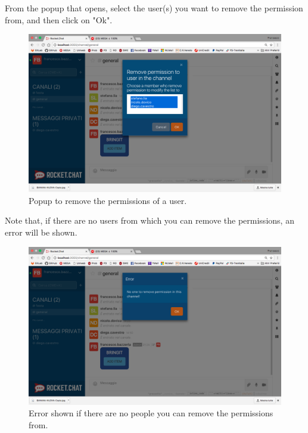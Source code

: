 From the popup that opens, select the user(s) you want to remove the permission from, and then click on "Ok".

\begin{figure}[H]
  \centering 
  \includegraphics[width=\textwidth]{Sections/3-HowToUse/Images/popup_permission_remove.png}
  \caption{Popup to remove the permissions of a user.}
\end{figure}

Note that, if there are no users from which you can remove the permissions, an error will be shown.

\begin{figure}[H]
  \centering 
  \includegraphics[width=\textwidth]{Sections/3-HowToUse/Images/popup_permission_remove_error.png}
  \caption{Error shown if there are no people you can remove the permissions from.}
\end{figure}